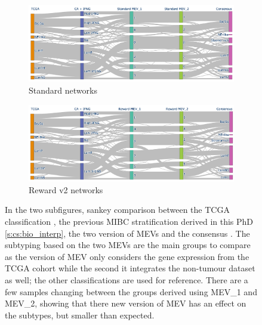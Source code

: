 \begin{figure}[!b]
    \centering
    \begin{subfigure}{1.0\linewidth}
        \includegraphics[width=1.0\textwidth,keepaspectratio]{Sections/Network_II/validation/mevs_comp_std.png}
        \caption{Standard networks}
    \end{subfigure} %
    \centering
    \begin{subfigure}{1.0\linewidth}
        \includegraphics[width=1.0\textwidth,keepaspectratio]{Sections/Network_II/validation/mevs_comp_rwd.png}
        \caption{Reward v2 networks}
    \end{subfigure}
    \centering
    \caption{In the two subfigures, sankey comparison between the TCGA classification \citep{Robertson2017-mg}, the previous MIBC stratification derived in this PhD \cref{s:cs:bio_interp}, the two version of MEVs and the consensus \citep{Kamoun2020-tj}. The subtyping based on the two MEVs are the main groups to compare as the version of MEV only considers the gene expression from the TCGA cohort while the second it integrates the non-tumour dataset as well; the other classifications are used for reference. There are a few samples changing between the groups derived using MEV\_1 and MEV\_2, showing that there new version of MEV has an effect on the subtypes, but smaller than expected. }
    \label{fig:N_II:mevs_comp}
\end{figure}





